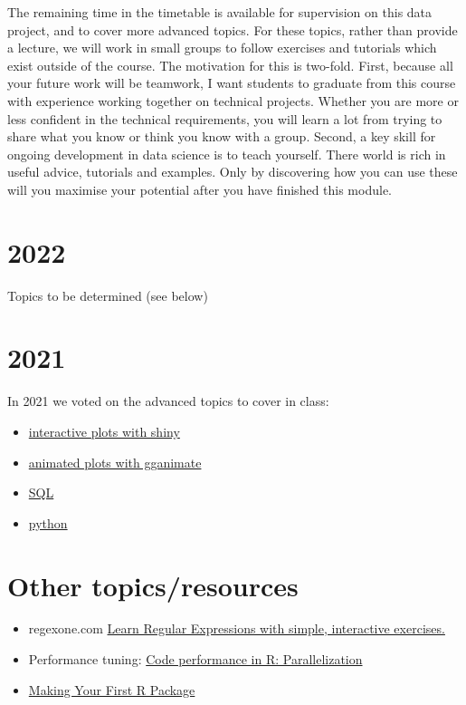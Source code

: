 \documentclass[
]{book}
\providecommand{\tightlist}{%
  \setlength{\itemsep}{0pt}\setlength{\parskip}{0pt}}
\begin{document}
The remaining time in the timetable is available for supervision on this data project, and to cover more advanced topics. For these topics, rather than provide a lecture, we will work in small groups to follow exercises and tutorials which exist outside of the course. The motivation for this is two-fold. First, because all your future work will be teamwork, I want students to graduate from this course with experience working together on technical projects. Whether you are more or less confident in the technical requirements, you will learn a lot from trying to share what you know or think you know with a group. Second, a key skill for ongoing development in data science is to teach yourself. There world is rich in useful advice, tutorials and examples. Only by discovering how you can use these will you maximise your potential after you have finished this module.

\hypertarget{section}{%
\section{2022}\label{section}}

Topics to be determined (see below)

\hypertarget{section-1}{%
\section{2021}\label{section-1}}

In 2021 we voted on the advanced topics to cover in class:

\begin{itemize}
\tightlist
\item
  \href{interactive-graphs-with-shiny.html}{interactive plots with shiny}
\item
  \href{animated-plots-with-gganimate.html}{animated plots with gganimate}
\item
  \href{database-queries-sql.html}{SQL}
\item
  \href{python.html}{python}
\end{itemize}

\hypertarget{other-topicsresources}{%
\section{Other topics/resources}\label{other-topicsresources}}

\begin{itemize}
\tightlist
\item
  regexone.com \href{https://regexone.com/}{Learn Regular Expressions with simple, interactive exercises.}
\item
  Performance tuning: \href{https://www.r-bloggers.com/2021/06/code-performance-in-r-parallelization/}{Code performance in R: Parallelization}
\item
  \href{https://tinyheero.github.io/jekyll/update/2015/07/26/making-your-first-R-package.html}{Making Your First R Package}
\end{itemize}
\end{document}
